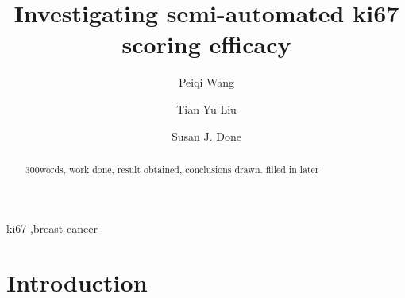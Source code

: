 \documentclass[final,3p,times]{elsarticle}
\begin{document}
\begin{frontmatter}

\title{Investigating semi-automated ki67 scoring efficacy}
\author[molgen]{Peiqi Wang}
\author[music]{Tian Yu Liu}
\author[cf]{Susan J. Done}
\address[molgen]{Department of Molecular Genetics and Microbiology, University of Toronto, Canada}
\address[music]{Faculty of Music, Univeristy of Toronto, ON, Canada}
\address[cf]{The Campbell Family Institute for Breast Cancer Research, Canada}

\begin{abstract}
300words, work done, result obtained, conclusions drawn. filled in later


%



\end{abstract}

\begin{keyword}
ki67 \sep breast cancer
\end{keyword}

\end{frontmatter}

\linenumbers

\section*{Introduction}
\end{document}
